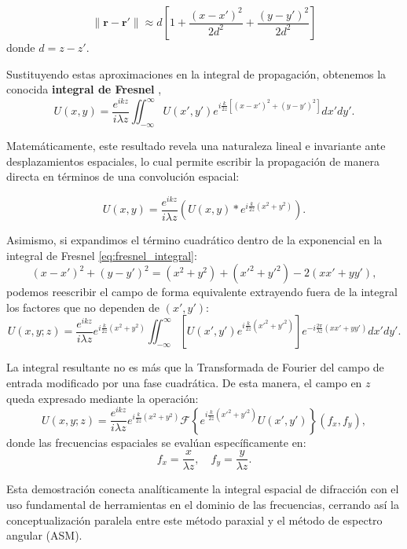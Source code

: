 $$\|\mathbf{r}-\mathbf{r}'\| \approx d \left[ 1 + \frac{(x-x')^2}{2d^2} + \frac{(y-y')^2}{2d^2} \right]$$
donde $d=z-z'$.

Sustituyendo estas aproximaciones en la integral de propagación, obtenemos la conocida \textbf{integral de Fresnel} \cite{goodman2005},
\begin{equation}
U(x,y) = \frac{e^{ikz}}{i\lambda z} \iint_{-\infty}^{\infty} U(x',y') e^{i\frac{k}{2z} \left[ (x-x')^2 + (y-y')^2 \right]} dx'dy'.
\label{eq:fresnel_integral}
\end{equation}

Matemáticamente, este resultado revela una naturaleza lineal e invariante ante desplazamientos espaciales, lo cual permite escribir la propagación de manera directa en términos de una convolución espacial:

\begin{equation}
U(x,y) = \frac{e^{ikz}}{i\lambda z} \left( U(x,y) * e^{i\frac{k}{2z}(x^2+y^2)} \right).
\end{equation}

Asimismo, si expandimos el término cuadrático dentro de la exponencial en la integral de Fresnel \eqref{eq:fresnel_integral}:
\begin{equation*}
(x-x')^2 + (y-y')^2 = (x^2 + y^2) + (x'^2 + y'^2) - 2(xx' + yy'),
\end{equation*}
podemos reescribir el campo de forma equivalente extrayendo fuera de la integral los factores que no dependen de $(x', y')$:
\begin{equation}
U(x,y;z) = \frac{e^{ikz}}{i\lambda z} e^{i\frac{k}{2z}(x^2+y^2)} \iint_{-\infty}^{\infty} \left[ U(x',y') e^{i\frac{k}{2z}(x'^2+y'^2)} \right] e^{-i\frac{2\pi}{\lambda z}(xx'+yy')} dx'dy'.
\end{equation}

La integral resultante no es más que la Transformada de Fourier del campo de entrada modificado por una fase cuadrática. De esta manera, el campo en $z$ queda expresado mediante la operación:
\begin{equation}
U(x,y;z) = \frac{e^{ikz}}{i\lambda z} e^{i\frac{k}{2z}(x^2+y^2)} \mathscr{F} \left\{ e^{i\frac{k}{2z}(x'^2+y'^2)} U(x',y') \right\}(f_x, f_y),
\end{equation}
donde las frecuencias espaciales se evalúan específicamente en:
\begin{equation}
f_x = \frac{x}{\lambda z}, \quad f_y = \frac{y}{\lambda z}.
\end{equation}

Esta demostración conecta analíticamente la integral espacial de difracción con el uso fundamental de herramientas en el dominio de las frecuencias, cerrando así la conceptualización paralela entre este método paraxial y el método de espectro angular (ASM).



